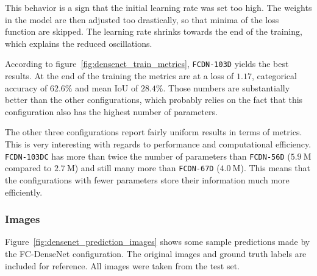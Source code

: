 This behavior is a sign that the initial learning rate was set too high. The weights in the model are then adjusted too drastically, so that minima of the loss function are skipped. The learning rate shrinks towards the end of the training, which explains the reduced oscillations.

According to figure~\ref{fig:densenet_train_metrics}, \texttt{FCDN-103D} yields the best results. At the end of the training the metrics are at a loss of $1.17$, categorical accuracy of $62.6\%$ and mean IoU of $28.4\%$. Those numbers are substantially better than the other configurations, which probably relies on the fact that this configuration also has the highest number of parameters.

The other three configurations report fairly uniform results in terms of metrics. This is very interesting with regards to performance and computational efficiency. \texttt{FCDN-103DC} has more than twice the number of parameters than \texttt{FCDN-56D} ($5.9~\text{M}$ compared to $2.7~\text{M}$) and still many more than \texttt{FCDN-67D} ($4.0~\text{M}$). This means that the configurations with fewer parameters store their information much more efficiently.

\subsubsection{Images}
Figure~\ref{fig:densenet_prediction_images} shows some sample predictions made by the FC-DenseNet configuration. The original images and ground truth labels are included for reference. All images were taken from the test set.

